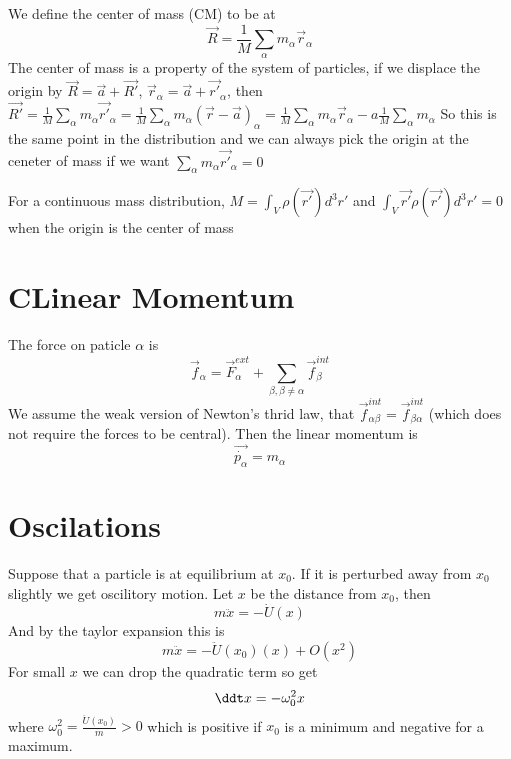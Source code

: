 \documentclass{homework}
\begin{document}
We define the center of mass (CM) to be at
\[\vec{R} = \frac{1}{M}\sum_{\alpha}m_{\alpha}\vec{r}_{\alpha}\]
The center of mass is a property of the system of particles, if we displace the origin by $\vec{R} = \vec{a} + \vec{R'}$, $\vec{r}_{\alpha} = \vec{a} + \vec{r'}_{\alpha}$, then $\vec{R'} = \frac{1}{M}\sum_{\alpha}m_{\alpha}\vec{r'}_{\alpha} = \frac{1}{M}\sum_{\alpha}m_{\alpha}(\vec{r} - \vec{a})_{\alpha} = \frac{1}{M}\sum_{\alpha}m_{\alpha}\vec{r}_{\alpha} -a\frac{1}{M}\sum_{\alpha} m_{\alpha}$
So this is the same point in the distribution and we can always pick the origin at the ceneter of mass if we want $\sum_{\alpha}m_{\alpha}\vec{r'}_{\alpha} = 0$


For a continuous mass distribution, $M = \int_{V} \rho(\vec{r'})d^3r'$ and $ \int_{V} \vec{r'}\rho(\vec{r'})d^3r' = 0$ when the origin is the center of mass

\section{CLinear Momentum}

The force on paticle $\alpha$ is 
\[\vec{f}_{\alpha} = \vec{F}_{\alpha}^{ext} + \sum_{\beta, \beta \neq \alpha}\vec{f}_{\beta}^{int}\]
We assume the weak version of Newton's thrid law, that $\vec{f}_{\alpha\beta}^{int} = \vec{f}_{\beta\alpha}^{int}$ (which does not require the forces to be central). Then the linear momentum is
\[\vec{\dot{p_{\alpha}}} = m_{\alpha}\]



\section{Oscilations}

Suppose that a particle is at equilibrium at $x_0$. If it is perturbed away from $x_0$ slightly we get oscilitory motion. Let $x$ be the distance from $x_0$, then
\[m\ddot x = -\dot U (x)\]
And by the taylor expansion this is
\[m\ddot x = -\ddot U(x_0)(x) + O(x^2)\]
For small $x$ we can drop the quadratic term so get
\[\ddt x = -\omega_0^2 x\]
where $\omega_0^2 = \frac{\ddot U(x_0)}{m} > 0$ which is positive if $x_0$ is a minimum and negative for a maximum. 
\end{document}
